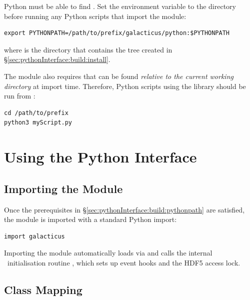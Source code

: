 Python must be able to find . Set the  environment variable to the  directory before running any Python scripts that import the module:
\begin{verbatim}
export PYTHONPATH=/path/to/prefix/galacticus/python:$PYTHONPATH
\end{verbatim}
where  is the directory that contains the  tree created in \S\ref{sec:pythonInterface:build:install}.

The module also requires that  can be found \emph{relative to the current working directory} at import time. Therefore, Python scripts using the library should be run from :
\begin{verbatim}
cd /path/to/prefix
python3 myScript.py
\end{verbatim}

\section{Using the Python Interface}\label{sec:pythonInterface:usage}

\subsection{Importing the Module}\label{sec:pythonInterface:usage:import}

Once the prerequisites in \S\ref{sec:pythonInterface:build:pythonpath} are satisfied, the module is imported with a standard Python import:
\begin{verbatim}
import galacticus
\end{verbatim}
Importing the module automatically loads  via  and calls the internal \glc\ initialisation routine , which sets up event hooks and the HDF5 access lock.

\subsection{Class Mapping}\label{sec:pythonInterface:usage:classes}

